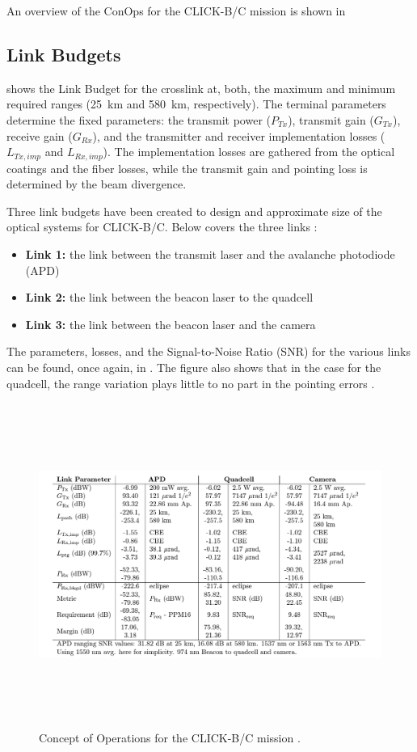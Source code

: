 An overview of the ConOps for the CLICK-B/C mission is shown in 

\subsection{Link Budgets}

 shows the Link Budget for the crosslink at, both, the maximum and minimum required ranges (\qty{25}{\kilo\meter} and \qty{580}{\kilo\meter}, respectively).
The terminal parameters determine the fixed parameters: the transmit power (\(P_{Tx}\)), transmit gain (\(G_{Tx}\)), receive gain (\(G_{Rx}\)), and the transmitter and receiver implementation losses (\(L_{Tx,imp}\) and \(L_{Rx,imp}\)).
The implementation losses are gathered from the optical coatings and the fiber losses, while the transmit gain and pointing loss is determined by the beam divergence.

Three link budgets have been created to design and approximate size of the optical systems for CLICK-B/C. Below covers the three links \cite{click_b}:
\begin{itemize}
    \item \textbf{Link 1:} the link between the transmit laser and the avalanche photodiode (APD) \cite{click_b}
    \item \textbf{Link 2:} the link between the beacon laser to the quadcell \cite{click_b}
    \item \textbf{Link 3:} the link between the beacon laser and the camera \cite{click_b}
\end{itemize}
The parameters, losses, and the Signal-to-Noise Ratio (SNR) for the various links can be found, once again, in . The figure also shows that in the case for the quadcell, the range variation plays little to no part in the pointing errors \cite{click_b_2}.

\begin{figure}[t]
    \centering
    \includegraphics[width=\textwidth, height=300pt]{images/click_b_link.PNG}
    \caption{Concept of Operations for the CLICK-B/C mission \cite{click_b}.}
    \label{fig:link_b}
\end{figure}


